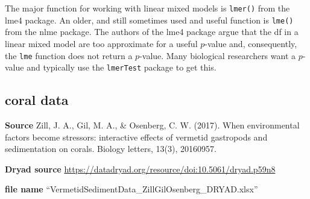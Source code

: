\documentclass[]{book}
\newenvironment{Shaded}{\begin{snugshade}}{\end{snugshade}}
\newcommand{\KeywordTok}[1]{\textcolor[rgb]{0.13,0.29,0.53}{\textbf{#1}}}
\newcommand{\DataTypeTok}[1]{\textcolor[rgb]{0.13,0.29,0.53}{#1}}
\newcommand{\StringTok}[1]{\textcolor[rgb]{0.31,0.60,0.02}{#1}}
\newcommand{\CommentTok}[1]{\textcolor[rgb]{0.56,0.35,0.01}{\textit{#1}}}
\newcommand{\OperatorTok}[1]{\textcolor[rgb]{0.81,0.36,0.00}{\textbf{#1}}}
\newcommand{\ErrorTok}[1]{\textcolor[rgb]{0.64,0.00,0.00}{\textbf{#1}}}
\newcommand{\NormalTok}[1]{#1}
\begin{document}
The major function for working with linear mixed models is
\texttt{lmer()} from the lme4 package. An older, and still sometimes
used and useful function is \texttt{lme()} from the nlme package. The
authors of the lme4 package argue that the df in a linear mixed model
are too approximate for a useful \(p\)-value and, consequently, the
\texttt{lme} function does not return a \(p\)-value. Many biological
researchers want a \(p\)-value and typically use the \texttt{lmerTest}
package to get this.

\subsection{coral data}\label{coral-data}

\textbf{Source} Zill, J. A., Gil, M. A., \& Osenberg, C. W. (2017). When
environmental factors become stressors: interactive effects of vermetid
gastropods and sedimentation on corals. Biology letters, 13(3),
20160957.

\textbf{Dryad source}
\url{https://datadryad.org/resource/doi:10.5061/dryad.p59n8}

\textbf{file name} ``VermetidSedimentData\_ZillGilOsenberg\_DRYAD.xlsx''

\begin{Shaded}
\end{Shaded}
\end{document}
